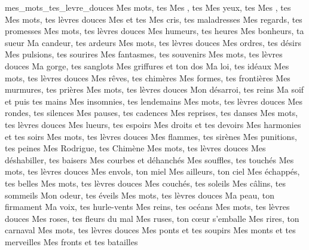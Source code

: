 \documentclass[../templates/main.tex]{subfiles}
\begin{document}
\begin{article}{mes_mots_tes_levre_douces}
	Mes mots, tes  
	Mes , tes  
	Mes yeux, tes  
	Mes , tes  
	Mes mots, tes lèvres douces
	Mes  et tes 
	Mes cris, tes maladresses
	Mes regards, tes promesses
	Mes mots, tes lèvres douces
	Mes humeurs, tes heures
	Mes bonheurs, ta sueur
	Ma candeur, tes ardeurs
	Mes mots, tes lèvres douces
	Mes ordres, tes désirs
	Mes pulsions, tes sourires
	Mes fantasmes, tes souvenirs
	Mes mots, tes lèvres douces
	Ma gorge, tes sanglots
	Mes griffures et ton dos
	Ma loi, tes idéaux
	Mes mots, tes lèvres douces
	Mes rêves, tes chimères
	Mes formes, tes frontières
	Mes murmures, tes prières
	Mes mots, tes lèvres douces
	Mon désarroi, tes reins
	Ma soif et puis tes mains
	Mes insomnies, tes lendemains
	Mes mots, tes lèvres douces
	Mes rondes, tes silences
	Mes pauses, tes cadences
	Mes reprises, tes danses
	Mes mots, tes lèvres douces
	Mes lueurs, tes espoirs
	Mes droits et tes devoirs
	Mes harmonies et tes soirs
	Mes mots, tes lèvres douces
	Mes flammes, tes sirènes
	Mes punitions, tes peines
	Mes Rodrigue, tes Chimène
	Mes mots, tes lèvres douces
	Mes déshabiller, tes baisers
	Mes courbes et déhanchés
	Mes souffles, tes touchés
	Mes mots, tes lèvres douces
	Mes envols, ton miel
	Mes ailleurs, ton ciel
	Mes échappés, tes belles
	Mes mots, tes lèvres douces
	Mes couchés, tes soleils
	Mes câlins, tes sommeils
	Mon odeur, tes éveils
	Mes mots, tes lèvres douces
	Ma peau, ton firmament
	Ma voix, tes hurle-vents
	Mes reins, tes océans
	Mes mots, tes lèvres douces
	Mes roses, tes fleurs du mal
	Mes ruses, ton cœur s'emballe
	Mes rires, ton carnaval
	Mes mots, tes lèvres douces
	Mes ponts et tes soupirs
	Mes monts et tes merveilles
	Mes fronts et tes batailles
\end{article}
\end{document}
